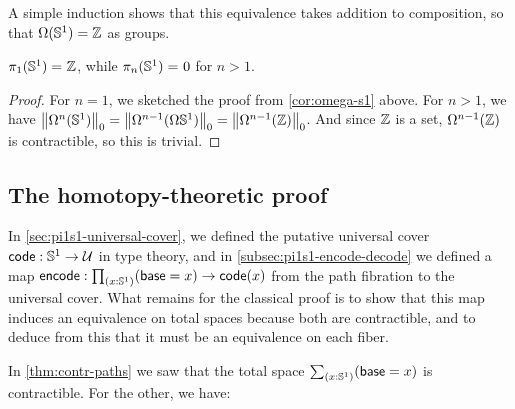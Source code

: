 A simple induction shows that this equivalence takes addition to
composition, so that $\Omega(\Sn ^1) = \Z$ as groups.

\begin{cor} \label{cor:pi1s1}
$\id{\pi_1(\Sn ^1)} {\Z}$, while $\id{\pi_n(\Sn ^1)}0$ for $n>1$.
\end{cor}
\begin{proof}
For $n=1$, we sketched the proof from \cref{cor:omega-s1} above.
For $n > 1$, we have $\trunc 0 {\Omega^{n}(\Sn ^1)} = \trunc 0 {\Omega^{n-1}(\Omega{\Sn ^1})} = \trunc 0 {\Omega^{n-1}(\Z)}$.
And since $\Z$ is a set, $\Omega^{n-1}(\Z)$ is contractible, so this is trivial.
\end{proof}

%


\subsection{The homotopy-theoretic proof}
\label{subsec:pi1s1-homotopy-theory}

In \cref{sec:pi1s1-universal-cover}, we defined the putative universal cover $\code:\Sn^1\to\type$ in type theory, and in \cref{subsec:pi1s1-encode-decode} we defined a map $\encode : \prd{x:\Sn^1} (\base=x) \to \code(x)$ from the path fibration to the universal cover.
What remains for the classical proof is to show that this map induces an equivalence on total spaces because both are contractible, and to deduce from this that it must be an equivalence on each fiber.

%
In \cref{thm:contr-paths} we saw that the total space $\sm{x:\Sn^1} (\base=x)$ is contractible.
For the other, we have:

